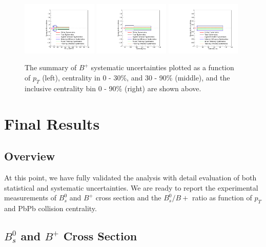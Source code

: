 \begin{figure}[hbtp]
\begin{center}
\includegraphics[width=0.32\textwidth]{Figures/Chapter4/BpPtSyst.pdf}
\includegraphics[width=0.32\textwidth]{Figures/Chapter4/BpCentSyst.pdf}
\includegraphics[width=0.32\textwidth]{Figures/Chapter4/BpIncSyst.pdf}
\caption{The summary of $B^+$ systematic uncertainties plotted as a function of $p_T$ (left), centrality in 0 - 30\%, and 30 - 90\% (middle), and the inclusive centrality bin 0 - 90\% (right) are shown above.}
\label{BPSystSumPlot}
\end{center}
\end{figure}

\clearpage

\section{Final Results} 

\subsection{Overview}

At this point, we have fully validated the analysis with detail evaluation of both statistical and systematic uncertainties. We are ready to report the experimental measurements of $B^0_s$ and $B^+$ cross section and the $B^0_s/B+$ ratio as function of $p_T$ and PbPb collision centrality.

\subsection{$B^0_s$ and $B^{+}$ Cross Section}

